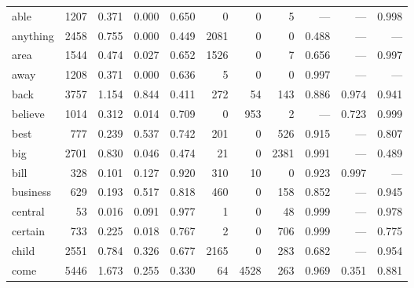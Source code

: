 \begin{landscape}
\begin{longtable}[c]{ l | r r c c | r r r | r r r }
  able       & 1207  & 0.371                   & 0.000           & 0.650      & 0         & 0           & 5            & —         & —           & 0.998\\
  anything   & 2458  & 0.755                   & 0.000           & 0.449      & 2081      & 0           & 0            & 0.488     & —           & —\\
  area       & 1544  & 0.474                   & 0.027           & 0.652      & 1526      & 0           & 7            & 0.656     & —           & 0.997\\
  away       & 1208  & 0.371                   & 0.000           & 0.636      & 5         & 0           & 0            & 0.997     & —           & —\\
  back       & 3757  & 1.154                   & 0.844           & 0.411      & 272       & 54          & 143          & 0.886     & 0.974       & 0.941\\
  believe    & 1014  & 0.312                   & 0.014           & 0.709      & 0         & 953         & 2            & —         & 0.723       & 0.999\\
  best       & 777   & 0.239                   & 0.537           & 0.742      & 201       & 0           & 526          & 0.915     & —           & 0.807\\
  big        & 2701  & 0.830                   & 0.046           & 0.474      & 21        & 0           & 2381         & 0.991     & —           & 0.489\\
  bill       & 328   & 0.101                   & 0.127           & 0.920      & 310       & 10          & 0            & 0.923     & 0.997       & —\\
  business   & 629   & 0.193                   & 0.517           & 0.818      & 460       & 0           & 158          & 0.852     & —           & 0.945\\
  central    & 53    & 0.016                   & 0.091           & 0.977      & 1         & 0           & 48           & 0.999     & —           & 0.978\\
  certain    & 733   & 0.225                   & 0.018           & 0.767      & 2         & 0           & 706          & 0.999     & —           & 0.775\\
  child      & 2551  & 0.784                   & 0.326           & 0.677      & 2165      & 0           & 283          & 0.682     & —           & 0.954\\
  come       & 5446  & 1.673                   & 0.255           & 0.330      & 64        & 4528        & 263          & 0.969     & 0.351       & 0.881\\

\end{longtable}
\end{landscape}
